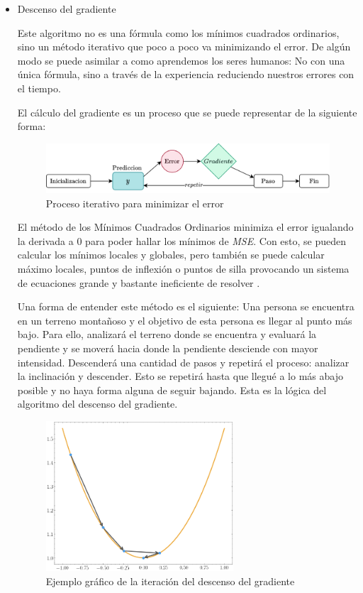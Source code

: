 \begin{itemize}
\item Descenso del gradiente

Este algoritmo no es una fórmula como los mínimos cuadrados ordinarios, sino un método iterativo que poco a poco va minimizando el error. De algún modo se puede asimilar a como aprendemos los seres humanos: No con una única fórmula, sino a través de la experiencia reduciendo nuestros errores con el tiempo.
\newline

El cálculo del gradiente es un proceso que se puede representar de la siguiente forma:
\begin{figure}[H]
    \centering
    \includegraphics[width=13cm]{images/state-of-art/gradient-descent/gradient-algorithm.png}
    \caption{Proceso iterativo para minimizar el error}
    \label{fig:gradient_descent}
\end{figure}

El método de los Mínimos Cuadrados Ordinarios minimiza el error igualando la derivada a $0$ para poder hallar los mínimos de \textit{MSE}. Con esto, se pueden calcular los mínimos locales y globales, pero también se puede calcular máximo locales, puntos de inflexión o puntos de silla provocando un sistema de ecuaciones grande y bastante ineficiente de resolver \cite{papert}.
\newline

Una forma de entender este método es el siguiente: Una persona se encuentra en un terreno montañoso y el objetivo de esta persona es llegar al punto más bajo. Para ello, analizará el terreno donde se encuentra y evaluará la pendiente y se moverá hacia donde la pendiente desciende con mayor intensidad. Descenderá una cantidad de pasos y repetirá el proceso: analizar la inclinación y descender. Esto se repetirá hasta que llegué a lo más abajo posible y no haya forma alguna de seguir bajando. Esta es la lógica del algoritmo del descenso del gradiente.

\begin{figure}[H]
    \centering
    \includegraphics[width=7cm]{images/state-of-art/gradient-descent/gradient.png}
    \caption{Ejemplo gráfico de la iteración del descenso del gradiente}
    \label{fig:gradient_descent}
\end{figure}



\end{itemize}
